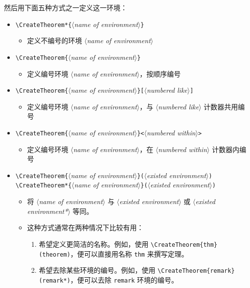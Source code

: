 \documentclass[allowbf]{lebhart}
\providecommand{\meta}[1]{$\langle${\normalfont\itshape#1}$\rangle$}
\begin{document}
然后用下面五种方式之一定义这一环境：
\begin{itemize}
    \item \lstinline|\CreateTheorem*{|\meta{name of environment}\lstinline|}|
        \begin{itemize}
            \item 定义不编号的环境 \meta{name of environment}
        \end{itemize}
    \item \lstinline|\CreateTheorem{|\meta{name of environment}\lstinline|}|
        \begin{itemize}
            \item 定义编号环境 \meta{name of environment}，按顺序编号
        \end{itemize}
    \item \lstinline|\CreateTheorem{|\meta{name of environment}\lstinline|}[|\meta{numbered like}\lstinline|]|
        \begin{itemize}
            \item 定义编号环境 \meta{name of environment}，与 \meta{numbered like} 计数器共用编号
        \end{itemize}
    \item \lstinline|\CreateTheorem{|\meta{name of environment}\lstinline|}<|\meta{numbered within}\lstinline|>|
        \begin{itemize}
            \item 定义编号环境 \meta{name of environment}，在 \meta{numbered within} 计数器内编号
        \end{itemize}
    \item \lstinline|\CreateTheorem{|\meta{name of environment}\lstinline|}(|\meta{existed environment}\lstinline|)|\\
    \lstinline|\CreateTheorem*{|\meta{name of environment}\lstinline|}(|\meta{existed environment}\lstinline|)|
        \begin{itemize}
            \item 将 \meta{name of environment} 与 \meta{existed environment} 或 \meta{existed environment*} 等同。
            \item 这种方式通常在两种情况下比较有用：
                \begin{enumerate}
                    \item 希望定义更简洁的名称。例如，使用 \lstinline|\CreateTheorem{thm}(theorem)|，便可以直接用名称 \texttt{thm} 来撰写定理。
                    \item 希望去除某些环境的编号。例如，使用 \lstinline|\CreateTheorem{remark}(remark*)|，便可以去除 \texttt{remark} 环境的编号。
                \end{enumerate}
        \end{itemize}
\end{itemize}
\end{document}
